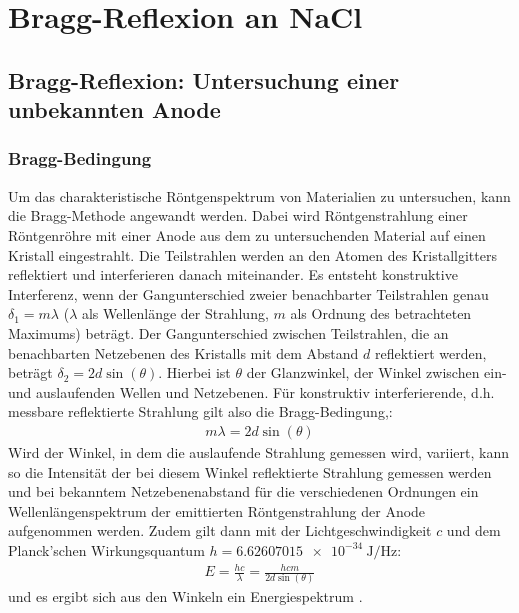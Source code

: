 \chapter{Bragg-Reflexion an NaCl}


\section{Bragg-Reflexion: Untersuchung einer unbekannten Anode} \label{sec:bragg_anode}

\subsection{Bragg-Bedingung}

Um das charakteristische Röntgenspektrum von Materialien zu untersuchen, kann die Bragg-Methode angewandt werden. Dabei wird Röntgenstrahlung einer Röntgenröhre mit einer Anode aus dem zu untersuchenden Material auf einen Kristall eingestrahlt. Die Teilstrahlen werden an den Atomen des Kristallgitters reflektiert und interferieren danach miteinander. Es entsteht konstruktive Interferenz, wenn der Gangunterschied zweier benachbarter Teilstrahlen genau $\delta_1 = m\lambda$ ($\lambda$ als Wellenlänge der Strahlung, $m$ als Ordnung des betrachteten Maximums) beträgt. Der Gangunterschied zwischen Teilstrahlen, die an benachbarten Netzebenen des Kristalls mit dem Abstand $d$ reflektiert werden, beträgt $\delta_2=2d\sin{(\theta)}$. Hierbei ist $\theta$ der Glanzwinkel, der Winkel zwischen ein- und auslaufenden Wellen und Netzebenen. Für konstruktiv interferierende, d.h. messbare reflektierte Strahlung gilt also die Bragg-Bedingung\cite[416]{Demtroeder3},\cite{LDBragg}:
\begin{align}
\label{eq:braggbedingung}
	m\lambda = 2d\sin{(\theta)}
\end{align}
Wird der Winkel, in dem die auslaufende Strahlung gemessen wird, variiert, kann so die Intensität der bei diesem Winkel reflektierte Strahlung gemessen werden und bei bekanntem Netzebenenabstand für die verschiedenen Ordnungen ein Wellenlängenspektrum der emittierten Röntgenstrahlung der Anode aufgenommen werden\cite{LDBragg}. Zudem gilt dann mit der Lichtgeschwindigkeit $c$ und dem Planck'schen Wirkungsquantum $h=\SI{6.626 07015e-34}{\joule\per\hertz}$\cite{KonstantenNIST}:
\begin{align} \label{eq:braggenergie}
E=\frac{hc}{\lambda}=\frac{hcm}{2d\sin{(\theta)} }
\end{align}
und es ergibt sich aus den Winkeln ein Energiespektrum \cite{LDWolfram}.

